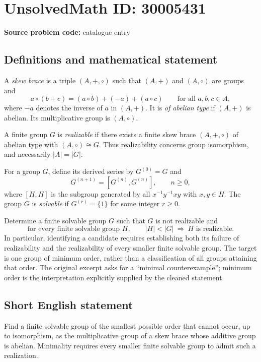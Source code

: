 \documentclass[11pt]{article}
\begin{document}
\section*{UnsolvedMath ID: 30005431}
\textbf{Source problem code:} catalogue entry
\subsection{Definitions and mathematical statement}
A \emph{skew brace} is a triple \((A,+,\circ)\) such that \((A,+)\) and \((A,\circ)\) are groups and
\[
 a\circ(b+c)=(a\circ b)+(-a)+(a\circ c)
 \qquad\text{for all }a,b,c\in A,
\]
where \(-a\) denotes the inverse of \(a\) in \((A,+)\). It is \emph{of abelian type} if \((A,+)\) is abelian. Its multiplicative group is \((A,\circ)\).

A finite group \(G\) is \emph{realizable} if there exists a finite skew brace \((A,+,\circ)\) of abelian type with \((A,\circ)\cong G\). Thus realizability concerns group isomorphism, and necessarily \(|A|=|G|\).

For a group \(G\), define its derived series by \(G^{(0)}=G\) and
\[
G^{(n+1)}=[G^{(n)},G^{(n)}],\qquad n\geq 0,
\]
where \([H,H]\) is the subgroup generated by all \(x^{-1}y^{-1}xy\) with \(x,y\in H\). The group \(G\) is \emph{solvable} if \(G^{(r)}=\{1\}\) for some integer \(r\geq 0\).

Determine a finite solvable group \(G\) such that \(G\) is not realizable and
\[
\text{for every finite solvable group }H,\qquad
|H|<|G|\ \Longrightarrow\ H\text{ is realizable}.
\]
In particular, identifying a candidate requires establishing both its failure of realizability and the realizability of every smaller finite solvable group. The target is one group of minimum order, rather than a classification of all groups attaining that order. The original excerpt asks for a ``minimal counterexample''; minimum order is the interpretation explicitly supplied by the cleaned statement.
\subsection{Short English statement}
Find a finite solvable group of the smallest possible order that cannot occur, up to isomorphism, as the multiplicative group of a skew brace whose additive group is abelian. Minimality requires every smaller finite solvable group to admit such a realization.
\end{document}
